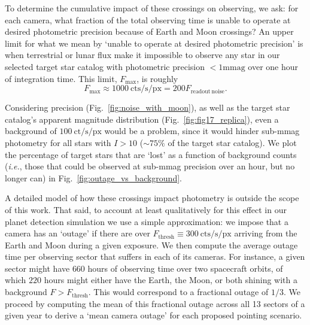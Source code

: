 To determine the cumulative impact of these crossings on \tesss observing, we ask: for each camera, what fraction of the total observing time is \tess unable to operate at desired photometric precision because of Earth and Moon crossings?
An upper limit for what we mean by `unable to operate at desired photometric precision' is when terrestrial or lunar flux make it impossible to observe any star in our selected target star catalog with photometric precision $<1 \text{mmag}$ over one hour of integration time.
This limit, $F_\text{max}$, is roughly
\begin{equation*}
 F_\mathrm{max} \approx 1000\mathrm{\ cts/s/px} = 200 F_\mathrm{readout\ noise}.
\end{equation*}

Considering \tesss precision (Fig.~\ref{fig:noise_with_moon}), as well as the target star catalog's apparent magnitude distribution (Fig.~\ref{fig:fig17_replica}), even a background of $100\ \text{ct/s/px}$ would be a problem, since it would hinder sub-mmag photometry for all stars with $I > 10$ ($\sim75\%$ of the target star catalog). We plot the percentage of target stars that are `lost' as a function of background counts (\textit{i.e.}, those that could be observed at sub-mmag precision over an hour, but no longer can) in Fig.~\ref{fig:outage_vs_background}.

A detailed model of how these crossings impact \tess photometry is outside the scope of this work.
That said, to account at least qualitatively for this effect in our planet detection simulation we use a simple approximation: we impose that a camera has an `outage' if there are over $F_\text{thresh}\equiv300\ \text{cts/s/px}$ arriving from the Earth and Moon during a given exposure.
We then compute the average outage time per observing sector that \tess suffers in each of its cameras. 
For instance, a given sector might have $660$ hours of observing time over two spacecraft orbits, of which $220$ hours might either have the Earth, the Moon, or both shining with a background $F > F_\text{thresh}$. 
This would correspond to a fractional outage of $1/3$. 
We proceed by computing the mean of this fractional outage across all 13 sectors of a given year to derive a `mean camera outage' for each proposed pointing scenario.

